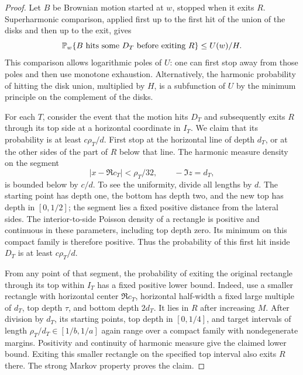 \begin{proof}
Let \(B\) be Brownian motion started at \(w\), stopped when it exits
\(R\).  Superharmonic comparison, applied first up to the first hit of
the union of the disks and then up to the exit, gives
\begin{equation}
 \mathbb P_w\{B\text{ hits some }D_T\text{ before exiting }R\}
 \le U(w)/H.
 \label{model:mesh-hitting-upper}
\end{equation}
This comparison allows logarithmic poles of \(U\): one can first stop
away from those poles and then use monotone exhaustion.  Alternatively,
the harmonic probability of hitting the disk union, multiplied by
\(H\), is a subfunction of \(U\) by the minimum principle on the
complement of the disks.

For each \(T\), consider the event that the motion hits \(D_T\) and
subsequently exits \(R\) through its top side at a horizontal coordinate
in \(I_T\).  We claim that its probability is at least
\(c\rho_T/d\).  First stop at the horizontal line of depth \(d_T\), or
at the other sides of the part of \(R\) below that line.  The harmonic
measure density on the segment
\[
 |x-\Re c_T|<\rho_T/32,
 \qquad -\Im z=d_T,
\]
is bounded below by \(c/d\).  To see the uniformity, divide all lengths
by \(d\).  The starting point has depth one, the bottom has depth two,
and the new top has depth in \([0,1/2]\); the segment lies a fixed
positive distance from the lateral sides.  The interior-to-side
Poisson density of a rectangle is positive and continuous in these
parameters, including top depth zero.  Its minimum on this compact
family is therefore positive.  Thus the probability of this first hit
inside \(D_T\) is at least \(c\rho_T/d\).

From any point of that segment, the probability of exiting the original
rectangle through its top within \(I_T\) has a fixed positive lower
bound.  Indeed, use a smaller rectangle with horizontal center
\(\Re c_T\), horizontal half-width a fixed large multiple of \(d_T\),
top depth \(\tau\), and bottom depth \(2d_T\).  It lies in \(R\) after
increasing \(M\).  After division by \(d_T\), its starting points,
top depth in \([0,1/4]\), and target intervals of length
\(\rho_T/d_T\in[1/b,1/a]\) again range over a compact family with
nondegenerate margins.  Positivity and continuity of harmonic measure
give the claimed lower bound.  Exiting this smaller rectangle on the
specified top interval also exits \(R\) there.  The strong Markov
property proves the claim.


\end{proof}
